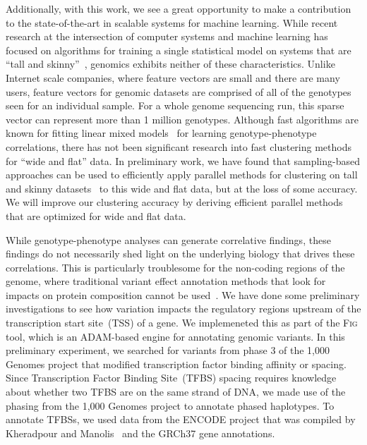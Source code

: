 \documentclass[11pt]{article} %
\begin{document}
Additionally, with this work, we see a great opportunity to make a contribution to the
state-of-the-art in scalable systems for machine learning. While recent research at the
intersection of computer systems and machine learning has focused on algorithms for training
a single statistical model on systems that are ``tall and skinny''~\cite{meng15, zadeh15},
genomics exhibits neither of these characteristics. Unlike Internet scale companies, where
feature vectors are small and there are many users, feature vectors for genomic datasets
are comprised of all of the genotypes seen for an individual sample. For a whole genome
sequencing run, this sparse vector can represent more than 1 million genotypes. Although
fast algorithms are known for fitting linear mixed models~\cite{lippert11} for learning
genotype-phenotype correlations, there has not been significant research into fast clustering
methods for ``wide and flat'' data. In preliminary work, we have found that sampling-based
approaches can be used to efficiently apply parallel methods for clustering on tall and skinny
datasets~\cite{bahmani12, meng15} to this wide and flat data, but at the loss of some accuracy.
We will improve our clustering accuracy by deriving efficient parallel methods that are optimized
for wide and flat data.

While genotype-phenotype analyses can generate correlative findings, these findings do not
necessarily shed light on the underlying biology that drives these correlations. This is
particularly troublesome for the non-coding regions of the genome, where traditional variant
effect annotation methods that look for impacts on protein composition cannot be
used~\cite{mclaren10}. We have done some preliminary investigations to see how variation impacts
the regulatory regions upstream of the transcription start site~(TSS) of a gene. We implemeneted
this as part of the \textsc{Fig} tool, which is an \textsc{ADAM}-based engine for annotating
genomic variants. In this preliminary experiment, we searched for variants from phase 3 of the
1,000 Genomes project that modified transcription factor binding affinity or spacing. Since
Transcription Factor Binding Site~(TFBS) spacing requires knowledge about whether two TFBS are
on the same strand of DNA, we made use of the phasing from the 1,000 Genomes project to annotate
phased haplotypes. To annotate TFBSs, we used data from the ENCODE project that was compiled by
Kheradpour and Manolis~\cite{kheradpour14} and the GRCh37 gene annotations.
\end{document}
